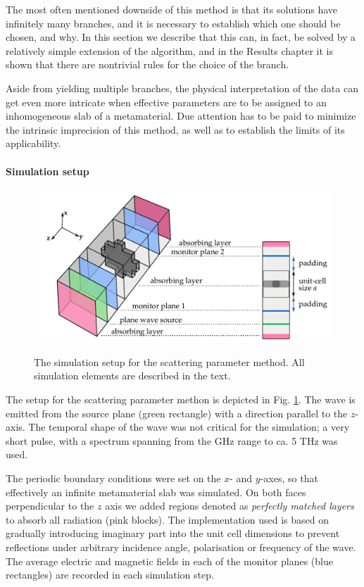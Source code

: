 The most often mentioned downside of this method is that its solutions have infinitely many branches, and it is necessary to establish which one should be chosen, and why. In this section we describe that this can, in fact, be solved by a relatively simple extension of the algorithm, and in the Results chapter it is shown that there are nontrivial rules for the choice of the branch.

Aside from yielding multiple branches, the physical interpretation of the data can get even more intricate when effective parameters are to be assigned to an inhomogeneous slab of a metamaterial. Due attention has to be paid to minimize the intrinsic imprecision of this method, as well as to establish the limits of its applicability. 
\paragraph{Simulation setup} %
\begin{figure}[ht] \centering \caption{The simulation setup for the scattering parameter method. All simulation elements are described in the text.
} \includegraphics[width=.8\textwidth]{img/meep_geometry.pdf}  \label{fg_fdtd_sparam} \end{figure} %
The setup for the scattering parameter methon is depicted in Fig. \ref{fg_fdtd_sparam}. The wave is emitted from the source plane (green rectangle) with a direction parallel to the $z$-axis. The temporal shape of the wave was not critical for the simulation; a very short pulse, with a spectrum spanning from the GHz range to ca. 5 THz was used. 

The periodic boundary conditions were set on the $x$- and $y$-axes, so that effectively an infinite metamaterial slab was simulated. On both faces perpendicular to the $z$ axis we added regions denoted as \textit{perfectly matched layers} \cite{oskooi2011distinguishing} to absorb all radiation (pink blocks). The implementation used is based on gradually introducing imaginary part into the unit cell dimensions to prevent reflections under arbitrary incidence angle, polarisation or frequency of the wave.
The average electric and magnetic fields in each of the monitor planes (blue rectangles) are recorded  in each simulation step.  

